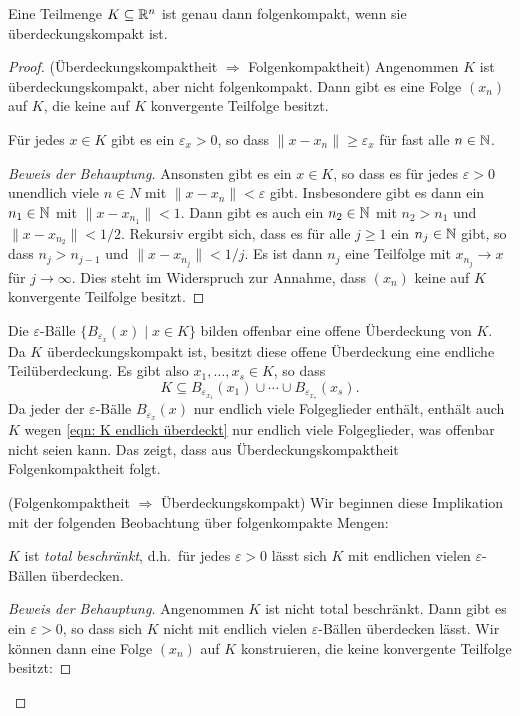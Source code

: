 \documentclass[a4paper,10pt]{article}
\begin{document}
\begin{prop}
 Eine Teilmenge $K \subseteq \mathbb{R}^n$ ist genau dann folgenkompakt, wenn sie überdeckungskompakt ist.
\end{prop}
\begin{proof}
 (Überdeckungskompaktheit $\Rightarrow$ Folgenkompaktheit) Angenommen $K$ ist überdeckungskompakt, aber nicht folgenkompakt. Dann gibt es eine Folge $(x_n)$ auf $K$, die keine auf $K$ konvergente Teilfolge besitzt.
 
 \begin{beh}
  Für jedes $x \in K$ gibt es ein $\varepsilon_x > 0$, so dass $\|x - x_n\| \geq \varepsilon_x$ für fast alle $n \in \mathbb{N}$.
 \end{beh}
 \begin{proof}[Beweis der Behauptung]
  Ansonsten gibt es ein $x \in K$, so dass es für jedes $\varepsilon > 0$ unendlich viele $n \in N$ mit $\|x - x_n\| < \varepsilon$ gibt. Insbesondere gibt es dann ein $n_1 \in \mathbb{N}$ mit $\|x - x_{n_1}\| < 1$. Dann gibt es auch ein $n_2 \in \mathbb{N}$ mit $n_2 > n_1$ und $\|x - x_{n_2}\| < 1/2$. Rekursiv ergibt sich, dass es für alle $j \geq 1$ ein $n_j \in \mathbb{N}$ gibt, so dass $n_j > n_{j-1}$ und $\|x - x_{n_j}\| < 1/j$. Es ist dann $n_j$ eine Teilfolge mit $x_{n_j} \to x$ für $j \to \infty$. Dies steht im Widerspruch zur Annahme, dass $(x_n)$ keine auf $K$ konvergente Teilfolge besitzt.
 \end{proof}
 
 Die $\varepsilon$-Bälle $\{B_{\varepsilon_x}(x) \mid x \in K\}$ bilden offenbar eine offene Überdeckung von $K$. Da $K$ überdeckungskompakt ist, besitzt diese offene Überdeckung eine endliche Teilüberdeckung. Es gibt also $x_1, \dotsc, x_s \in K$, so dass
 \begin{equation}\label{eqn: K endlich überdeckt}
  K \subseteq B_{\varepsilon_{x_1}}(x_1) \cup \dotsb \cup B_{\varepsilon_{x_s}}(x_s).
 \end{equation}
 Da jeder der $\varepsilon$-Bälle $B_{\varepsilon_x}(x)$ nur endlich viele Folgeglieder enthält, enthält auch $K$ wegen \eqref{eqn: K endlich überdeckt} nur endlich viele Folgeglieder, was offenbar nicht seien kann. Das zeigt, dass aus Überdeckungskompaktheit Folgenkompaktheit folgt.
 
 (Folgenkompaktheit $\Rightarrow$ Überdeckungskompakt) Wir beginnen diese Implikation mit der folgenden Beobachtung über folgenkompakte Mengen:
 
 \begin{beh}
  $K$ ist \emph{total beschränkt}, d.h.\ für jedes $\varepsilon > 0$ lässt sich $K$ mit endlichen vielen $\varepsilon$-Bällen überdecken.
 \end{beh}
 \begin{proof}[Beweis der Behauptung]
  Angenommen $K$ ist nicht total beschränkt. Dann gibt es ein $\varepsilon > 0$, so dass sich $K$ nicht mit endlich vielen $\varepsilon$-Bällen überdecken lässt. Wir können dann eine Folge $(x_n)$ auf $K$ konstruieren, die keine konvergente Teilfolge besitzt:
  

\end{proof}
\end{proof}
\end{document}
